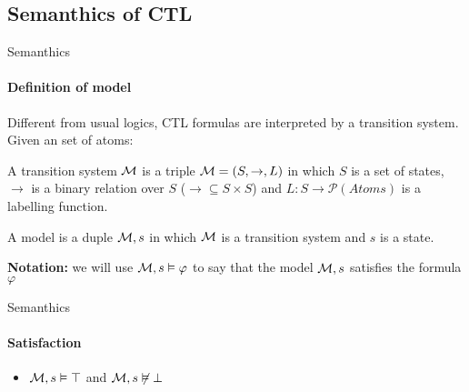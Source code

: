 \subsection{Semanthics of CTL}
\begin{frame}{Semanthics}
	\framesubtitle{Definition of model}
	Different from usual logics, CTL formulas are interpreted by a transition system. Given an set of atoms:\pause
	\begin{definition}[1]
		A transition system $\mathcal{M}$ is a triple $\mathcal{M} = (S, \to, L)$ in which $S$ is a set of states, $\to$ is a binary relation over $S$ ($\to \subseteq S\times S$) and $L: S \to \mathcal{P}(Atoms)$ is a labelling function.
	\end{definition}\pause
	\begin{definition}[2]
		A model is a duple $\mathcal{M},s$ in which $\mathcal{M}$ is a transition system and $s$ is a state.
	\end{definition}\pause
	
	{\bf Notation:} we will use $\mathcal{M},s\vDash \varphi$ to say that the model $\mathcal{M},s$ satisfies the formula $\varphi$
\end{frame}

\begin{frame}{Semanthics}
	\framesubtitle{Satisfaction}
	\begin{itemize}
		\item $\mathcal{M},s \vDash \top$ and $\mathcal{M},s \not\vDash \bot$ \pause
	\end{itemize}
\end{frame}